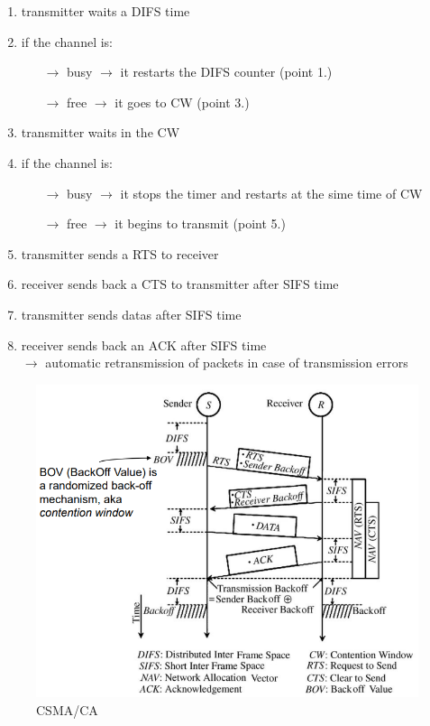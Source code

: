 \begin{itemize}
\begin{enumerate}
        \item transmitter waits a DIFS time
        \item if the channel is:
        \begin{itemize}
            \vspace{-0.1cm}\item[$\rightarrow$] busy $\rightarrow$ it restarts the DIFS counter (point 1.)
            \vspace{-0.1cm}\item[$\rightarrow$] free $\rightarrow$ it goes to CW (point 3.)
        \end{itemize}
        \item transmitter waits in the CW
        \item if the channel is:
        \begin{itemize}
            \vspace{-0.1cm}\item[$\rightarrow$] busy $\rightarrow$ it stops the timer and restarts at the sime time of CW
            \vspace{-0.1cm}\item[$\rightarrow$] free $\rightarrow$ it begins to transmit (point 5.)
        \end{itemize}
        \item transmitter sends a RTS to receiver
        \item receiver sends back a CTS to transmitter after SIFS time
        \item transmitter sends datas after SIFS time
        \item receiver sends back an ACK after SIFS time\\
        $\rightarrow$ automatic retransmission of packets in case of transmission errors
    \end{enumerate}
\end{itemize}

\begin{figure}[!h] 
    \centering 
    \includegraphics[scale = 0.35]{images/data-sending-procedure.png} 
    \caption{CSMA/CA}
    \label{CSMA/CA}
\end{figure}

